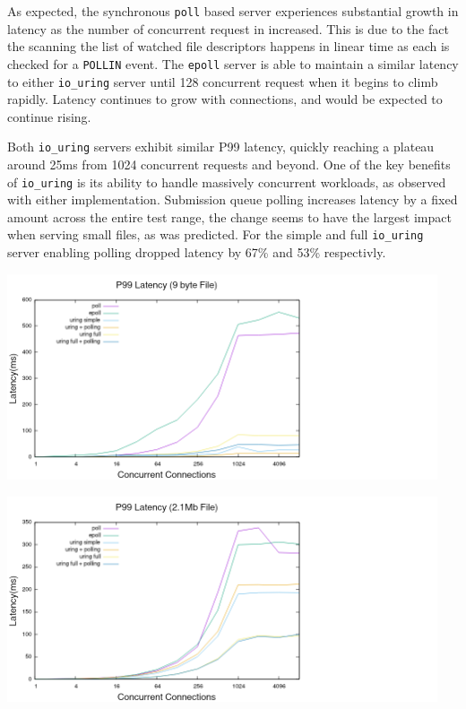 \documentclass[letterpaper, 10pt, twocolumn]{article}
\begin{document}
As expected, the synchronous \texttt{poll} based server experiences substantial growth in latency as the number of concurrent request in increased. This is due to the fact the scanning the list of watched file descriptors happens in linear time as each is checked for a \texttt{POLLIN} event. The \texttt{epoll} server is able to maintain a similar latency to either \texttt{io\_uring} server until 128 concurrent request when it begins to climb rapidly. Latency continues to grow with connections, and would be expected to continue rising.

Both \texttt{io\_uring} servers exhibit similar P99 latency, quickly reaching a plateau around 25ms from 1024 concurrent requests and beyond. One of the key benefits of \texttt{io\_uring} is its ability to handle massively concurrent workloads, as observed with either implementation. Submission queue polling increases latency by a fixed amount across the entire test range, the change seems to have the largest impact when serving small files, as was predicted. For the simple and full \texttt{io\_uring} server enabling polling dropped latency by 67\% and 53\% respectivly.

\begin{center}
\includegraphics[width=5in]{tiny_p99.png}
\end{center}

\begin{center}
\includegraphics[width=5in]{large_p99.png}
\end{center}
\end{document}
